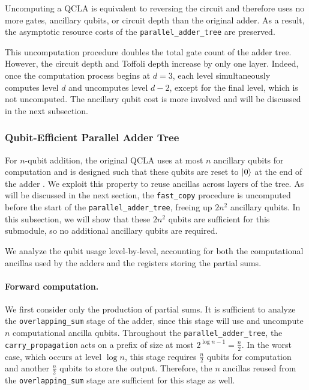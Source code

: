 \documentclass[reprint,amsmath,amssymb,aps,pra]{revtex4-2}
\newtheorem{claim}{Claim}
\begin{document}
Uncomputing a QCLA is equivalent to reversing the circuit and therefore uses no more gates, ancillary qubits, or circuit depth than the original adder. As a result, the asymptotic resource costs of the \texttt{parallel\_adder\_tree} are preserved.


This uncomputation procedure doubles the total gate count of the adder tree. However, the circuit depth and Toffoli depth increase by only one layer. Indeed, once the computation process begins at $d=3$, each level simultaneously computes level $d$ and uncomputes level $d-2$, except for the final level, which is not uncomputed. The ancillary qubit cost is more involved and will be discussed in the next subsection.

\subsubsection{Qubit-Efficient Parallel Adder Tree}\label{subsec:efficient_adder}

For $n$-qubit addition, the original QCLA uses at most $n$ ancillary qubits for computation and is designed such that these qubits are reset to $\ket{0}$ at the end of the adder \cite{Draper2004}. We exploit this property to reuse ancillas across layers of the tree. As will be discussed in the next section, the \texttt{fast\_copy} procedure is uncomputed before the start of the \texttt{parallel\_adder\_tree}, freeing up $2n^2$ ancillary qubits. In this subsection, we will show that these $2n^2$ qubits are sufficient for this submodule, so no additional ancillary qubits are required.

We analyze the qubit usage level-by-level, accounting for both the computational ancillas used by the adders and the registers storing the partial sums.

\paragraph{Forward computation.}
We first consider only the production of partial sums. It is sufficient to analyze the \texttt{overlapping\_sum} stage of the adder, since this stage will use and uncompute $n$ computational ancilla qubits. Throughout the \texttt{parallel\_adder\_tree}, the \texttt{carry\_propagation} acts on a prefix of size at most $2^{\log{n}-1} = \frac{n}{2}$. In the worst case, which occurs at level $\log{n}$, this stage requires $\frac{n}{2}$ qubits for computation and another $\frac{n}{2}$ qubits to store the output. Therefore, the $n$ ancillas reused from the \texttt{overlapping\_sum} stage are sufficient for this stage as well.
\end{document}
